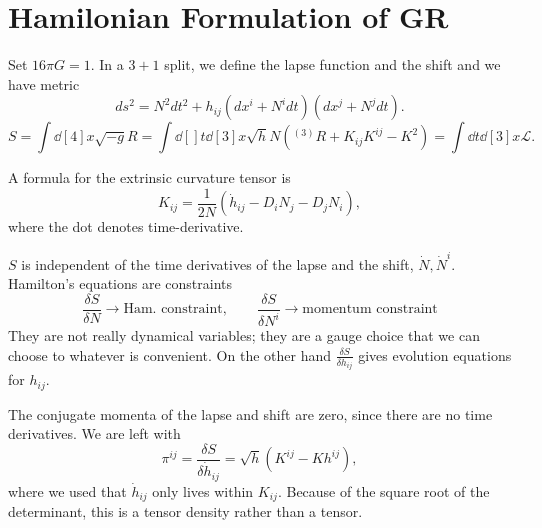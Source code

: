 \section{Hamilonian Formulation of GR}%
\label{sec:hamilonian_formulation}

Set $16 \pi G = 1$.  In a $3 + 1$ split, we define the lapse function and the shift and we have metric
\begin{equation}
  ds^2 = N^2 dt^2 + h_{ij} (dx^{i} + N^{i} dt) (dx^{j} + N^{j} dt).
\end{equation}
\begin{equation}
  S = \int \dd[4]{x} \sqrt{-g } R = \int \dd[]{t} \dd[3]{x} \sqrt{h} N ({}^{(3)} R + K_{ij} K^{ij} - K^2) = \int \dd{t} \dd[3]{x} \mathscr{L}.
\end{equation}

\begin{exercise}[Sheet 2]
  A formula for the extrinsic curvature tensor is
  \begin{equation}
    K_{ij} = \frac{1}{2 N} (\dot{h}_{ij} - D_{i} N_j - D_j N_i),
  \end{equation}
  where the dot denotes time-derivative.
\end{exercise}
\begin{remark}
  $S$ is independent of the time derivatives of the lapse and the shift, $\dot{N}, \dot{N}^{i}$. Hamilton's equations are constraints
  \begin{equation}
    \frac{\delta S}{\delta N} \rightarrow \text{Ham.~constraint}, \qquad 
    \frac{\delta S}{\delta N^{i}} \rightarrow \text{momentum constraint}
  \end{equation}
  They are not really dynamical variables; they are a gauge choice that we can choose to whatever is convenient.
  On the other hand $\frac{\delta S}{\delta h_{ij}}$ gives evolution equations for $h_{ij}$.

  The conjugate momenta of the lapse and shift are zero, since there are no time derivatives.
  We are left with
  \begin{equation}
    \pi^{ij} = \frac{\delta S}{\delta \dot{h}_{ij}} = \sqrt{h} (K^{ij} - K h^{ij}),
  \end{equation}
  where we used that $\dot{h}_{ij}$ only lives within $K_{ij}$.
  Because of the square root of the determinant, this is a tensor density rather than a tensor.
\end{remark}
